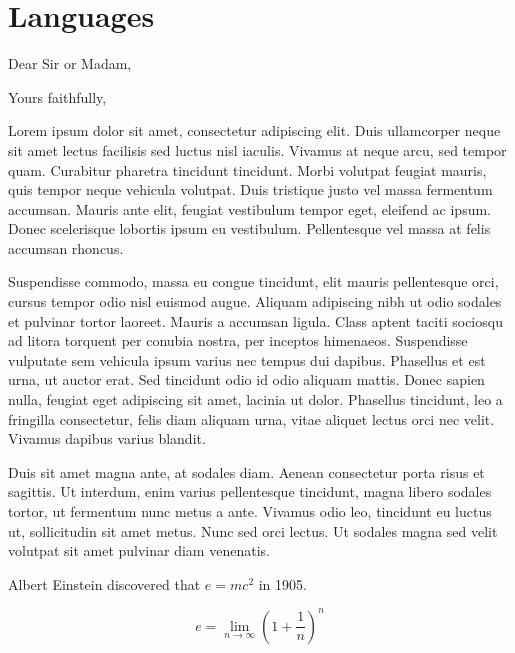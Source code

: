 \documentclass[11pt,a4paper,sans]{moderncv}        %
\begin{document}
\section{Languages}

\date{January 01, 1984}
\opening{Dear Sir or Madam,}
\closing{Yours faithfully,}
\makelettertitle

Lorem ipsum dolor sit amet, consectetur adipiscing elit. Duis ullamcorper neque sit amet lectus facilisis sed luctus nisl iaculis. Vivamus at neque arcu, sed tempor quam. Curabitur pharetra tincidunt tincidunt. Morbi volutpat feugiat mauris, quis tempor neque vehicula volutpat. Duis tristique justo vel massa fermentum accumsan. Mauris ante elit, feugiat vestibulum tempor eget, eleifend ac ipsum. Donec scelerisque lobortis ipsum eu vestibulum. Pellentesque vel massa at felis accumsan rhoncus.

Suspendisse commodo, massa eu congue tincidunt, elit mauris pellentesque orci, cursus tempor odio nisl euismod augue. Aliquam adipiscing nibh ut odio sodales et pulvinar tortor laoreet. Mauris a accumsan ligula. Class aptent taciti sociosqu ad litora torquent per conubia nostra, per inceptos himenaeos. Suspendisse vulputate sem vehicula ipsum varius nec tempus dui dapibus. Phasellus et est urna, ut auctor erat. Sed tincidunt odio id odio aliquam mattis. Donec sapien nulla, feugiat eget adipiscing sit amet, lacinia ut dolor. Phasellus tincidunt, leo a fringilla consectetur, felis diam aliquam urna, vitae aliquet lectus orci nec velit. Vivamus dapibus varius blandit.

Duis sit amet magna ante, at sodales diam. Aenean consectetur porta risus et sagittis. Ut interdum, enim varius pellentesque tincidunt, magna libero sodales tortor, ut fermentum nunc metus a ante. Vivamus odio leo, tincidunt eu luctus ut, sollicitudin sit amet metus. Nunc sed orci lectus. Ut sodales magna sed velit volutpat sit amet pulvinar diam venenatis.

Albert Einstein discovered that $e=mc^2$ in 1905.

\[ e=\lim_{n \to \infty} \left(1+\frac{1}{n}\right)^n \]

\makeletterclosing

\fi
\end{document}
